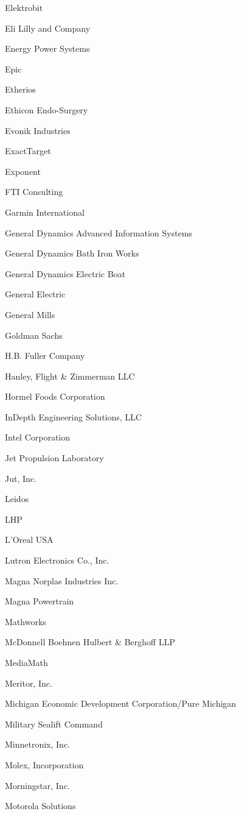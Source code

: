 \documentclass[twoside]{article}
\begin{document}
\begin{center}
\begin{multicols}{5}
\begin{FlushLeft}
\begin{compactitem}
\item Elektrobit
\item Eli Lilly and Company
\item Energy Power Systems
\item Epic
\item Etherios
\item Ethicon Endo-Surgery
\item Evonik Industries
\item ExactTarget
\item Exponent
\item FTI Consulting
\item Garmin International
\item General Dynamics Advanced Information Systems
\item General Dynamics Bath Iron Works
\item General Dynamics Electric Boat
\item General Electric
\item General Mills
\item Goldman Sachs
\item H.B. Fuller Company
\item Hanley, Flight \& Zimmerman LLC
\item Hormel Foods Corporation
\item InDepth Engineering Solutions, LLC
\item Intel Corporation
\item Jet Propulsion Laboratory
\item Jut, Inc.
\item Leidos
\item LHP
\item L'Oreal USA
\item Lutron Electronics Co., Inc.
\item Magna Norplas Industries Inc.
\item Magna Powertrain
\item Mathworks
\item McDonnell Boehnen Hulbert \& Berghoff LLP
\item MediaMath
\item Meritor, Inc.
\item Michigan Economic Development Corporation/Pure Michigan
\item Military Sealift Command
\item Minnetronix, Inc.
\item Molex, Incorporation
\item Morningstar, Inc.
\item Motorola Solutions

\end{compactitem}
\end{FlushLeft}
\end{multicols}
\end{center}
\end{document}
